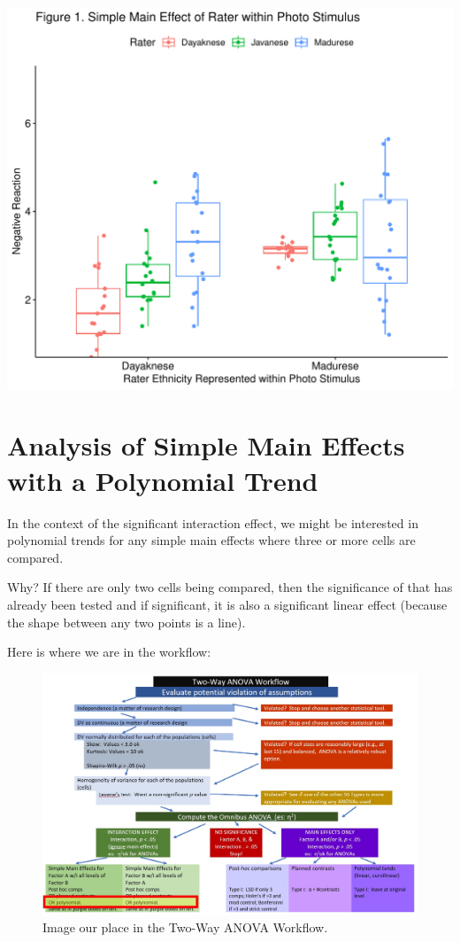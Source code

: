 \documentclass[
  11pt,
]{book}
\begin{document}
\includegraphics{13-moReTwoWay_files/figure-latex/unnamed-chunk-15-1.pdf}

\hypertarget{analysis-of-simple-main-effects-with-a-polynomial-trend}{%
\section*{Analysis of Simple Main Effects with a Polynomial Trend}\label{analysis-of-simple-main-effects-with-a-polynomial-trend}}


In the context of the significant interaction effect, we might be interested in polynomial trends for any simple main effects where three or more cells are compared.

Why? If there are only two cells being compared, then the significance of that has already been tested and if significant, it is also a significant linear effect (because the shape between any two points is a line).

Here is where we are in the workflow:

\begin{figure}
\centering
\includegraphics{images/factorial/WrkFlw_Poly.jpg}
\caption{Image our place in the Two-Way ANOVA Workflow.}
\end{figure}
\end{document}

